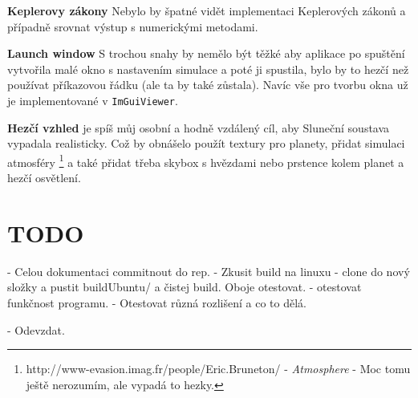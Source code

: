 \begin{description}
	\item \textbf{Keplerovy zákony}
	Nebylo by špatné vidět implementaci Keplerových zákonů a případně srovnat výstup s numerickými metodami.
	\item \textbf{Launch window} S trochou snahy by nemělo být těžké aby aplikace po spuštění vytvořila malé okno s nastavením simulace a poté ji spustila, bylo by to hezčí než používat příkazovou řádku (ale ta by také zůstala). Navíc vše pro tvorbu okna už je implementované v \texttt{ImGuiViewer}.
	\item \textbf{Hezčí vzhled} je spíš můj osobní a hodně vzdálený cíl, aby Sluneční soustava vypadala realisticky. Což by obnášelo použít textury pro planety, přidat simulaci atmosféry \footnote{ http://www-evasion.imag.fr/people/Eric.Bruneton/  - \textit{Atmosphere} - Moc tomu ještě nerozumím, ale vypadá to hezky.} a také přidat třeba skybox s hvězdami nebo prstence kolem planet a hezčí osvětlení.
\end{description}


\section{TODO}
	

- Celou dokumentaci commitnout do rep.
- Zkusit build na linuxu - clone do nový složky a pustit buildUbuntu/ 
	a čistej build. Oboje otestovat.
- otestovat funkčnost programu.
- Otestovat různá rozlišení a co to dělá.

- Odevzdat.

